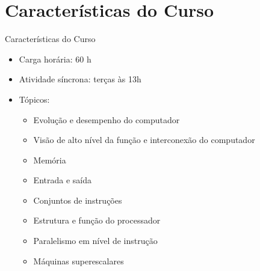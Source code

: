    \section[ slide = true]{Características do Curso}
      \begin{slide}[toc=]{Características do Curso}
         \begin{itemize}
            \item Carga horária: 60 h
            \item Atividade síncrona: terças às 13h
            \item Tópicos:
            \begin{itemize}
               \item Evolução e desempenho do computador
               \item Visão de alto nível da função e interconexão do computador
               \item Memória
               \item Entrada e saída
               \item Conjuntos de instruções
               \item Estrutura e função do processador
               \item Paralelismo em nível de instrução
               \item Máquinas superescalares
            \end{itemize}
         \end{itemize}         
      \end{slide}
      
